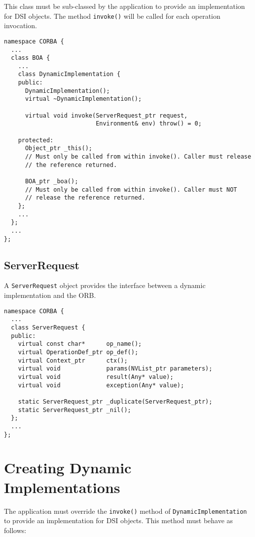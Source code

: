 \documentclass[11pt,twoside,onecolumn]{book}
\begin{document}
This class must be sub-classed by the application to provide an implementation
for DSI objects. The method {\tt invoke()} will be called for each operation
invocation.

{\small \begin{verbatim}
namespace CORBA {
  ...
  class BOA {
    ...
    class DynamicImplementation {
    public:
      DynamicImplementation();
      virtual ~DynamicImplementation();

      virtual void invoke(ServerRequest_ptr request,
                          Environment& env) throw() = 0;

    protected:
      Object_ptr _this();
      // Must only be called from within invoke(). Caller must release
      // the reference returned.

      BOA_ptr _boa();
      // Must only be called from within invoke(). Caller must NOT
      // release the reference returned.
    };
    ...
  };
  ...
};
\end{verbatim}}


\subsection{ServerRequest}

A {\tt ServerRequest} object provides the interface between a dynamic
implementation and the ORB.

{\small \begin{verbatim}
namespace CORBA {
  ...
  class ServerRequest {
  public:
    virtual const char*      op_name();
    virtual OperationDef_ptr op_def();
    virtual Context_ptr      ctx();
    virtual void             params(NVList_ptr parameters);
    virtual void             result(Any* value);
    virtual void             exception(Any* value);

    static ServerRequest_ptr _duplicate(ServerRequest_ptr);
    static ServerRequest_ptr _nil();
  };
  ...
};
\end{verbatim}}


\section{Creating Dynamic Implementations}

The application must override the {\tt invoke()} method of
{\tt DynamicImplementation} to provide an implementation for DSI objects.
This method must behave as follows:
\end{document}
